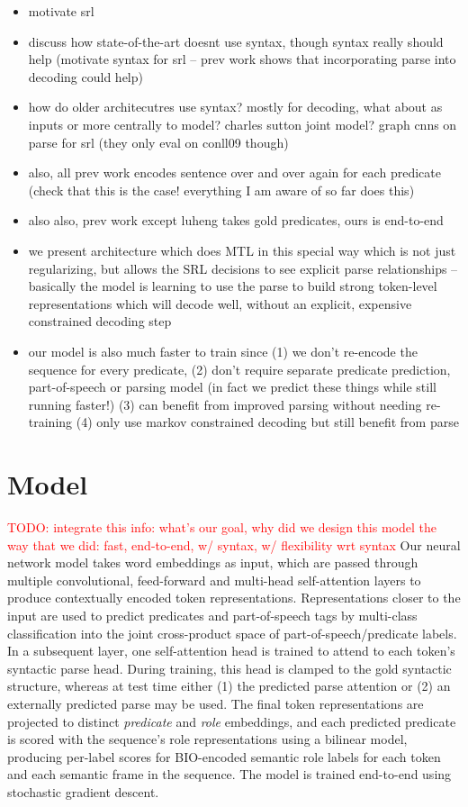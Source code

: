 \documentclass[11pt,a4paper]{article}
\newcommand{\todo}[1]{\textcolor{red}{TODO: #1}}
\begin{document}
\begin{itemize}
  \item motivate srl
  \item discuss how state-of-the-art doesnt use syntax, though syntax really should help (motivate syntax for srl -- prev work \citep{he2017deep} shows that incorporating parse into decoding could help)
  \item how do older architecutres use syntax? mostly for decoding, what about as inputs or more centrally to model? charles sutton joint model? graph cnns on parse for srl (they only eval on conll09 though)
  \item also, all prev work encodes sentence over and over again for each predicate (check that this is the case! everything I am aware of so far does this)
  \item also also, prev work except luheng takes gold predicates, ours is end-to-end
  \item we present architecture which does MTL in this special way which is not just regularizing, but allows the SRL decisions to see explicit parse relationships -- basically the model is learning to use the parse to build strong token-level representations which will decode well, without an explicit, expensive constrained decoding step
  \item our model is also much faster to train since (1) we don't re-encode the sequence for every predicate, (2) don't require separate predicate prediction, part-of-speech or parsing model (in fact we predict these things while still running faster!) (3) can benefit from improved parsing without needing re-training  (4) only use markov constrained decoding but still benefit from parse
\end{itemize}

\section{Model}
\todo{integrate this info: what's our goal, why did we design this model the way that we did: fast, end-to-end, w/ syntax, w/ flexibility wrt syntax}
Our neural network model takes word embeddings as input, which are passed through multiple convolutional, feed-forward and multi-head self-attention layers \citep{vaswani2017attention} to produce contextually encoded token representations. Representations closer to the input are used to predict predicates and part-of-speech tags by multi-class classification into the joint cross-product space of part-of-speech/predicate labels. In a subsequent layer, one self-attention head is trained to attend to each token's syntactic parse head. During training, this head is clamped to the gold syntactic structure, whereas at test time either (1) the predicted parse attention or (2) an externally predicted parse may be used. The final token representations are projected to distinct \emph{predicate} and \emph{role} embeddings, and each predicted predicate is scored with the sequence's role representations using a bilinear model, producing per-label scores for BIO-encoded semantic role labels for each token and each semantic frame in the sequence. The model is trained end-to-end using stochastic gradient descent. 
\end{document}
